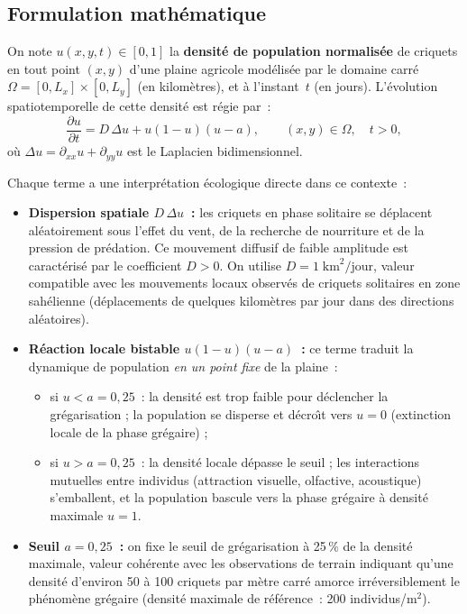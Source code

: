 \documentclass[11pt,a4paper]{report}
\begin{document}
\subsection*{Formulation math\'ematique}

On note $u(x,y,t) \in [0,1]$ la \textbf{densit\'e de population normalis\'ee} de criquets
en tout point $(x,y)$ d'une plaine agricole mod\'elis\'ee par le domaine carr\'e
$\Omega = [0, L_x]\times[0, L_y]$ (en kilom\`etres), et \`a l'instant~$t$ (en jours).
L'\'evolution spatiotemporelle de cette densit\'e est r\'egie par~:
\begin{equation}\label{eq:nagumo2D_criquet}
  \frac{\partial u}{\partial t}
  = D\,\Delta u + u(1-u)(u-a),
  \qquad (x,y)\in\Omega,\quad t > 0,
\end{equation}
o\`u $\Delta u = \partial_{xx}u + \partial_{yy}u$ est le Laplacien bidimensionnel.

\medskip
\noindent Chaque terme a une interpr\'etation \'ecologique directe dans ce contexte~:

\begin{itemize}[leftmargin=2em]
  \item \textbf{Dispersion spatiale $D\,\Delta u$~:} les criquets en phase solitaire
        se d\'eplacent al\'eatoirement sous l'effet du vent, de la recherche de
        nourriture et de la pression de pr\'edation. Ce mouvement diffusif de faible
        amplitude est caract\'eris\'e par le coefficient $D > 0$. On utilise
        $D = 1\;\text{km}^2/\text{jour}$, valeur compatible avec les mouvements
        locaux observ\'es de criquets solitaires en zone sah\'elienne
        (d\'eplacements de quelques kilom\`etres par jour dans des directions al\'eatoires).

  \item \textbf{R\'eaction locale bistable $u(1-u)(u-a)$~:} ce terme traduit la
        dynamique de population \emph{en un point fixe} de la plaine~:
        \begin{itemize}[leftmargin=1.5em]
          \item si $u < a = 0{,}25$~: la densit\'e est trop faible pour d\'eclencher
                la gr\'egarisation ; la population se disperse et d\'ecro\^{\i}t
                vers $u = 0$ (extinction locale de la phase gr\'egaire) ;
          \item si $u > a = 0{,}25$~: la densit\'e locale d\'epasse le seuil ;
                les interactions mutuelles entre individus (attraction visuelle,
                olfactive, acoustique) s'emballent, et la population bascule
                vers la phase gr\'egaire \`a densit\'e maximale $u = 1$.
        \end{itemize}

  \item \textbf{Seuil $a = 0{,}25$~:} on fixe le seuil de gr\'egarisation \`a
        25\,\% de la densit\'e maximale, valeur coh\'erente avec les observations
        de terrain indiquant qu'une densit\'e d'environ 50 \`a 100 criquets par
        m\`etre carr\'e amorce irr\'eversiblement le ph\'enom\`ene gr\'egaire
        (densit\'e maximale de r\'ef\'erence~: 200 individus/m$^2$).
\end{itemize}
\end{document}
